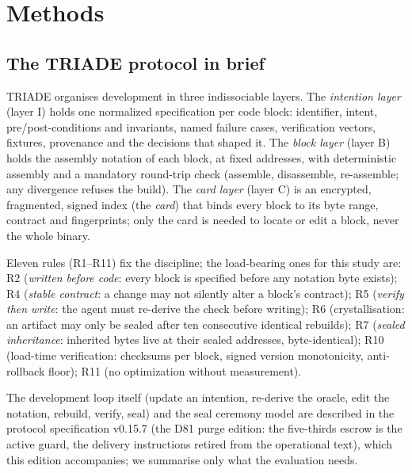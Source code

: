 \documentclass[11pt,a4paper]{article}
\begin{document}
\section{Methods}\label{sec:methods}

\subsection{The TRIADE protocol in brief}\label{sec:protocole}

TRIADE organises development in three indissociable layers. The
\emph{intention layer} (layer I) holds one normalized specification per
code block: identifier, intent, pre/post-conditions and invariants, named
failure cases, verification vectors, fixtures, provenance and the
decisions that shaped it. The \emph{block layer} (layer B) holds the
assembly notation of each block, at fixed addresses, with deterministic
assembly and a mandatory round-trip check (assemble, disassemble,
re-assemble; any divergence refuses the build). The \emph{card layer}
(layer C) is an encrypted, fragmented, signed index (the \emph{card}) that
binds every block to its byte range, contract and fingerprints; only the
card is needed to locate or edit a block, never the whole binary.

Eleven rules (R1--R11) fix the discipline; the load-bearing ones for this
study are: R2 (\emph{written before code}: every block is specified before
any notation byte exists); R4 (\emph{stable contract}: a change may not
silently alter a block's contract); R5 (\emph{verify then write}: the
agent must re-derive the check before writing); R6 (crystallisation: an
artifact may only be sealed after ten consecutive identical rebuilds);
R7 (\emph{sealed inheritance}: inherited bytes live at their sealed
addresses, byte-identical); R10 (load-time verification: checksums per
block, signed version monotonicity, anti-rollback floor); R11 (no
optimization without measurement).

The development loop itself (update an intention, re-derive the oracle,
edit the notation, rebuild, verify, seal) and the seal ceremony model are
described in the protocol specification v0.15.7 (the D81 purge edition: the five-thirds escrow is the active guard, the delivery instructions retired from the operational text), which this edition
accompanies; we summarise only what the evaluation needs.
\end{document}
